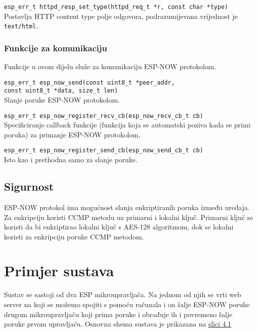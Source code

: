 \documentclass[seminarskirad]{fer}
\begin{document}
\verb|esp_err_t httpd_resp_set_type(httpd_req_t *r, const char *type)| \\
Postavlja HTTP content type polje odgovora, podrazumijevana vrijednost je \verb|text/html|.

\subsection{Funkcije za komunikaciju}

Funkcije u ovom dijelu služe za komunikaciju ESP-NOW protokolom.

\verb|esp_err_t esp_now_send(const uint8_t *peer_addr, | \\
\verb|const uint8_t *data, size_t len)| \\
Slanje poruke ESP-NOW protokolom.

\verb|esp_err_t esp_now_register_recv_cb(esp_now_recv_cb_t cb)| \\
Specificiranje callback funkcije (funkcija koja se automatski poziva kada se primi poruka) za primanje ESP-NOW protokolom.

\verb|esp_err_t esp_now_register_send_cb(esp_now_send_cb_t cb)| \\
Isto kao i prethodna samo za slanje poruke.

\section{Sigurnost}

ESP-NOW protokol ima mogućnost slanja enkriptiranih poruka između uređaja. Za enkripciju koristi CCMP metodu uz primarni i lokalni ključ. Primarni ključ se koristi da bi enkriptirao lokalni ključ s AES-128 algoritmom, dok se lokalni koristi za enkripciju poruke CCMP metodom. 

\chapter{Primjer sustava}
\label{pog:primjer_sustava}

Sustav se sastoji od dva ESP mikroupravljača. Na jednom od njih se vrti web server na koji se možemo spojiti s pomoću računala i on šalje ESP-NOW poruke drugom mikroupravljaču koji prima poruke i obrađuje ih i povremeno šalje poruke prvom upravljaču. Osnovna shema sustava je prikazana na \hyperref[slk:prvaslika]{slici 4.1}

\end{document}
